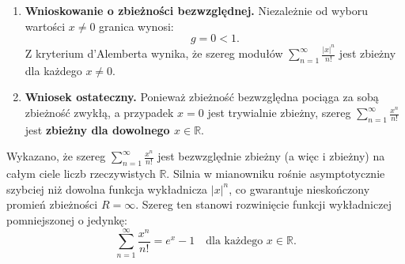 \begin{enumerate}[label=\textbf{Krok \arabic*.},leftmargin=*]
    \item \textbf{Wnioskowanie o zbieżności bezwzględnej.}
    Niezależnie od wyboru wartości $x \neq 0$ granica wynosi:
    \begin{equation*}
        g = 0 < 1.
    \end{equation*}
    Z kryterium d'Alemberta wynika, że szereg modułów $\sum_{n=1}^{\infty} \frac{|x|^n}{n!}$ jest zbieżny dla każdego $x \neq 0$.

    \item \textbf{Wniosek ostateczny.}
    Ponieważ zbieżność bezwzględna pociąga za sobą zbieżność zwykłą, a przypadek $x=0$ jest trywialnie zbieżny, szereg $\displaystyle\sum_{n=1}^{\infty} \frac{x^n}{n!}$ jest \textbf{zbieżny dla dowolnego $x \in \mathbb{R}$}.
\end{enumerate}

\vspace{0.2cm}

\begin{odpowiedzbox}
Wykazano, że szereg $\displaystyle\sum_{n=1}^{\infty} \frac{x^n}{n!}$ jest bezwzględnie zbieżny (a więc i zbieżny) na całym ciele liczb rzeczywistych $\mathbb{R}$. Silnia w mianowniku rośnie asymptotycznie szybciej niż dowolna funkcja wykładnicza $|x|^n$, co gwarantuje nieskończony promień zbieżności $R = \infty$. Szereg ten stanowi rozwinięcie funkcji wykładniczej pomniejszonej o jedynkę:
\begin{equation*}
    \sum_{n=1}^{\infty} \frac{x^n}{n!} = e^x - 1 \quad \text{dla każdego } x \in \mathbb{R}.
\end{equation*}
\end{odpowiedzbox}
